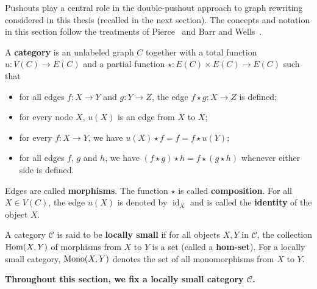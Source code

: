 Pushouts play a central role in the double-pushout approach to graph rewriting considered in this thesis (recalled in the next section). The concepts and notation in this section follow the treatments of Pierce~\cite{pierce1991basic} and Barr and Wells~\cite{barr1990category}.
\begin{definition}
    \label{def:cat}
    A \textbf{category} is an unlabeled graph \( C \) together with a total function \( u : V(C) \to E(C) \) and a partial function \( \star: E(C) \times E(C) \to E(C) \) such that 
        \begin{itemize}
            \item for all edges \( f:X \to Y \) and \( g:Y \to Z \), the edge \( f \star g :X \to Z \) is defined; 
            \item  for every node \( X \), \( u(X) \) is an edge from \( X \) to \( X \);
            \item for every \( f:X \to Y \), we have \(u(X) \star f = f = f \star u(Y)\);
            \item for all edges \( f \), \( g \) and \(h\), we have \( (f \star g) \star h = f \star (g \star h) \) whenever either side is defined.
        \end{itemize}
    Edges are called \textbf{morphisms}. The function $\star$ is called \textbf{composition}. For all \( X \in V(C) \), the edge \( u(X) \) is denoted by \( \operatorname{id}_X \) and is called the \textbf{identity} of the object \( X \).
\end{definition}    
\begin{definition}
    A category \(\mathcal{C}\) is said to be \textbf{locally small} if for all objects \(X,Y\) in \(\mathcal{C}\), the collection $\operatorname{Hom}(X,Y)$ of morphisms from \(X\) to \(Y\) is a set (called a \textbf{hom-set}). For a locally small category, $\operatorname{Mono}(X,Y)$ denotes the set of all monomorphisms from $X$ to $Y$.
\end{definition}
\textbf{Throughout this section, we fix a locally small category \( \mathcal{C} \).}
